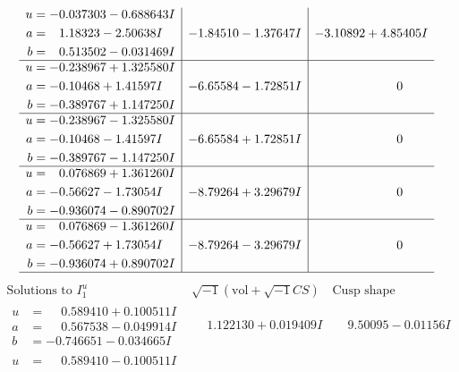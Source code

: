 \documentclass[1p]{elsarticle_modified}
\theoremstyle{definition}
\newcommand{\I}{\sqrt{-1}}
\begin{document}
$$\begin{array}{c|c|c}
\begin{aligned}
u &= -0.037303 - 0.688643 I \\
a &= \phantom{-}1.18323 - 2.50638 I \\
b &= \phantom{-}0.513502 - 0.031469 I\end{aligned}
 & -1.84510 - 1.37647 I & -3.10892 + 4.85405 I \\ \hline\begin{aligned}
u &= -0.238967 + 1.325580 I \\
a &= -0.10468 + 1.41597 I \\
b &= -0.389767 + 1.147250 I\end{aligned}
 & -6.65584 - 1.72851 I & \phantom{-0.000000 } 0 \\ \hline\begin{aligned}
u &= -0.238967 - 1.325580 I \\
a &= -0.10468 - 1.41597 I \\
b &= -0.389767 - 1.147250 I\end{aligned}
 & -6.65584 + 1.72851 I & \phantom{-0.000000 } 0 \\ \hline\begin{aligned}
u &= \phantom{-}0.076869 + 1.361260 I \\
a &= -0.56627 - 1.73054 I \\
b &= -0.936074 - 0.890702 I\end{aligned}
 & -8.79264 + 3.29679 I & \phantom{-0.000000 } 0 \\ \hline\begin{aligned}
u &= \phantom{-}0.076869 - 1.361260 I \\
a &= -0.56627 + 1.73054 I \\
b &= -0.936074 + 0.890702 I\end{aligned}
 & -8.79264 - 3.29679 I & \phantom{-0.000000 } 0\\
 \hline 
 \end{array}$$\newpage$$\begin{array}{c|c|c}  
\text{Solutions to }I^u_{1}& \I (\text{vol} + \sqrt{-1}CS) & \text{Cusp shape}\\
 \hline 
\begin{aligned}
u &= \phantom{-}0.589410 + 0.100511 I \\
a &= \phantom{-}0.567538 - 0.049914 I \\
b &= -0.746651 - 0.034665 I\end{aligned}
 & \phantom{-}1.122130 + 0.019409 I & \phantom{-}9.50095 - 0.01156 I \\ \hline\begin{aligned}
u &= \phantom{-}0.589410 - 0.100511 I \\

\end{aligned}
\end{array}$$
\end{document}

